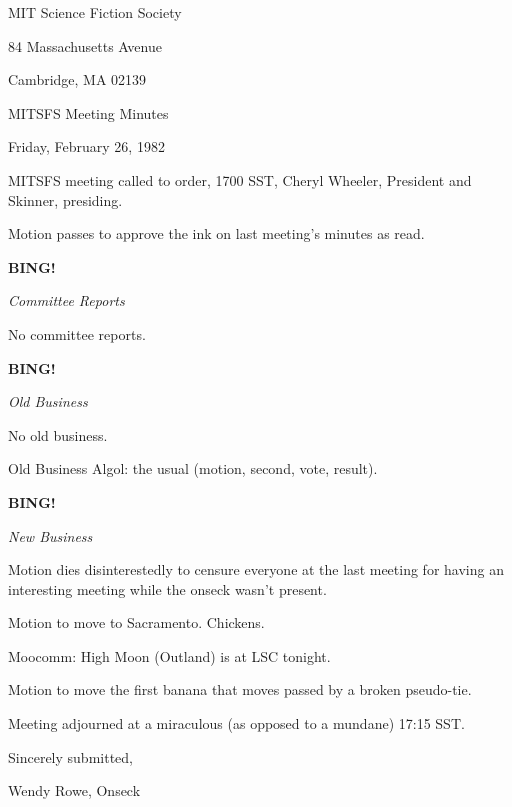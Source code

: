 \documentclass[12pt]{article}
\newcommand{\bing}{{\bf BING!} }
\newcommand{\goto}[1]{\bing \vskip 12pt \centerline{{\em{#1}}}}
\begin{document}
\begin{center}

MIT Science Fiction Society 

84 Massachusetts Avenue

Cambridge, MA 02139

\vspace{12pt}

MITSFS Meeting Minutes 

Friday, February 26, 1982

\end{center}
 
\vspace{18pt}

\setlength{\parskip}{6pt}

\noindent
MITSFS meeting called to order, 1700 SST,
Cheryl Wheeler, President and Skinner, presiding.

Motion passes to approve the ink on last meeting's minutes as read.

\goto{Committee Reports}

No committee reports.

\goto{Old Business}

No old business.

Old Business Algol: the usual (motion, second, vote, result).

\goto{New Business}

Motion dies disinterestedly to censure everyone at the last meeting for having an interesting meeting while the onseck wasn't present.

Motion to move to Sacramento. Chickens.

Moocomm: High Moon (Outland) is at LSC tonight.

Motion to move the first banana that moves passed by a broken pseudo-tie.

\vspace{12pt}

\noindent
Meeting adjourned at a miraculous (as opposed to a mundane) 17:15 SST.

\vspace{18pt}

\centerline{Sincerely submitted,}
\centerline{Wendy Rowe, Onseck}
\end{document}
